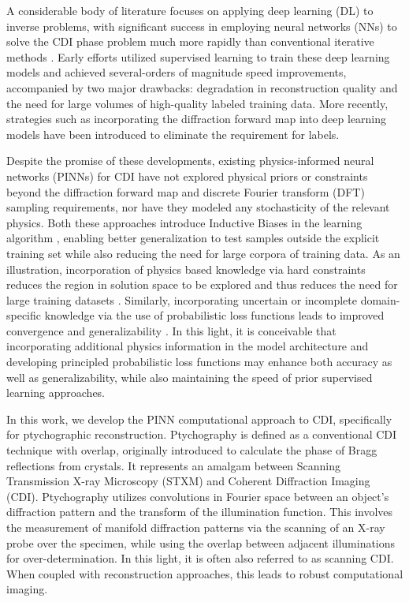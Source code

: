 \documentclass[sn-mathphys]{sn-jnl}%
\theoremstyle{thmstyleone}%
\theoremstyle{thmstyletwo}%
\theoremstyle{thmstylethree}%
\begin{document}
A considerable body of literature focuses on applying deep learning (DL) to inverse problems, with significant success in employing neural networks (NNs) to solve the CDI phase problem much more rapidly than conventional iterative methods \cite{ratner2021recovering,yao2022autophasenn}. Early efforts utilized supervised learning to train these deep learning models and achieved several-orders of magnitude speed improvements, accompanied by two major drawbacks: degradation in reconstruction quality and the need for large volumes of high-quality labeled training data. More recently, strategies such as incorporating the diffraction forward map into deep learning models have been introduced to eliminate the requirement for labels. 

Despite the promise of these developments, existing physics-informed neural networks (PINNs) for CDI have not explored physical priors or constraints beyond the diffraction forward map and discrete Fourier transform (DFT) sampling requirements, nor have they modeled any stochasticity of the relevant physics. Both these approaches introduce Inductive Biases in the learning algorithm \cite{mitchell1980need, baxter2000model}, enabling better generalization to test samples outside the explicit training set while also reducing the need for large corpora of training data. As an illustration, incorporation of physics based knowledge via hard constraints reduces the region in solution space to be explored and thus reduces the need for large training datasets \cite{baker2019workshop}. Similarly, incorporating uncertain or incomplete domain-specific knowledge via the use of probabilistic loss functions leads to improved convergence and generalizability \cite{baker2019workshop}. In this light, it is conceivable that incorporating additional physics information in the model architecture and developing principled probabilistic loss functions may enhance both accuracy as well as generalizability, while also maintaining the speed of prior supervised learning approaches. 

In this work, we develop the PINN computational approach to CDI, specifically for ptychographic reconstruction. Ptychography is defined as a conventional CDI technique with overlap, originally introduced to calculate the phase of Bragg reflections from crystals. It represents an amalgam between Scanning Transmission X-ray Microscopy (STXM) and Coherent Diffraction Imaging (CDI). Ptychography utilizes convolutions in Fourier space between an object's diffraction pattern and the transform of the illumination function. This involves the measurement of manifold diffraction patterns via the scanning of an X-ray probe over the specimen, while using the overlap between adjacent illuminations for over-determination. In this light, it is often also referred to as scanning CDI. When coupled with reconstruction approaches, this leads to robust computational imaging. 
\end{document}

